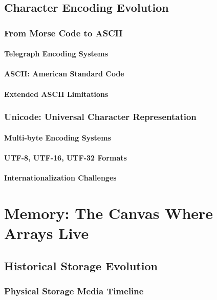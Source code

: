\documentclass[12pt, oneside]{book}
\begin{document}
\section{Character Encoding Evolution}
\subsection{From Morse Code to ASCII}
\subsubsection{Telegraph Encoding Systems}
\subsubsection{ASCII: American Standard Code}
\subsubsection{Extended ASCII Limitations}

\subsection{Unicode: Universal Character Representation}
\subsubsection{Multi-byte Encoding Systems}
\subsubsection{UTF-8, UTF-16, UTF-32 Formats}
\subsubsection{Internationalization Challenges}


\chapter{Memory: The Canvas Where Arrays Live}

\section{Historical Storage Evolution}
\subsection{Physical Storage Media Timeline}
\end{document}
